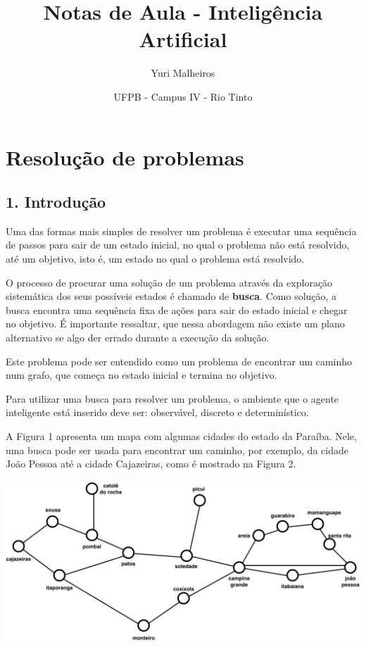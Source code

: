 \documentclass[brazil,]{article}
\title{Notas de Aula - Inteligência Artificial}
\author{Yuri Malheiros}
\date{UFPB - Campus IV - Rio Tinto}
\let\origfigure=\figure
\let\endorigfigure=\endfigure
\renewenvironment{figure}[1][]{%
\origfigure[H]
}{%
\endorigfigure
}
\begin{document}
\maketitle

\section{Resolução de problemas}\label{resoluuxe7uxe3o-de-problemas}

\subsection{1. Introdução}\label{introduuxe7uxe3o}

Uma das formas mais simples de resolver um problema é executar uma
sequência de passos para sair de um estado inicial, no qual o problema
não está resolvido, até um objetivo, isto é, um estado no qual o
problema está resolvido.

O processo de procurar uma solução de um problema através da exploração
sistemática dos seus possíveis estados é chamado de \textbf{busca}. Como
solução, a busca encontra uma sequência fixa de ações para sair do
estado inicial e chegar no objetivo. É importante ressaltar, que nessa
abordagem não existe um plano alternativo se algo der errado durante a
execução da solução.

Este problema pode ser entendido como um problema de encontrar um
caminho num grafo, que começa no estado inicial e termina no objetivo.

Para utilizar uma busca para resolver um problema, o ambiente que o
agente inteligente está inserido deve ser: observável, discreto e
determinístico.

A Figura 1 apresenta um mapa com algumas cidades do estado da Paraíba.
Nele, uma busca pode ser usada para encontrar um caminho, por exemplo,
da cidade João Pessoa até a cidade Cajazeiras, como é mostrado na Figura
2.

\begin{figure}
\centering
\includegraphics{pbmapa.png}
\caption{Mapa simplificado da Paraíba.}
\end{figure}
\end{document}
